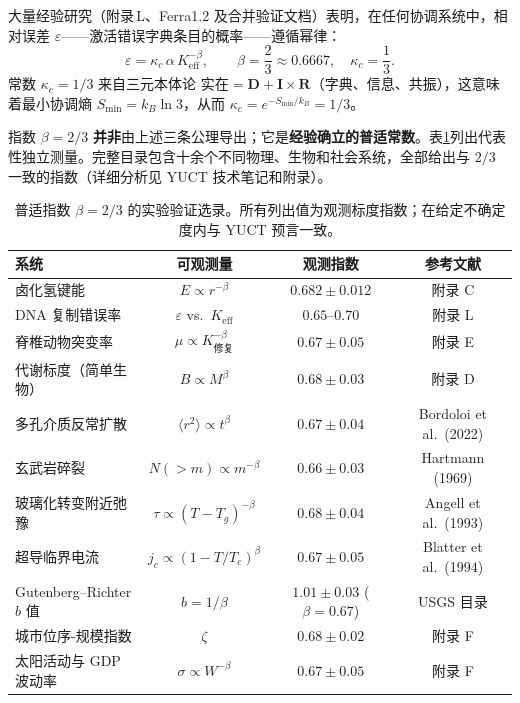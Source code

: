 \documentclass[12pt,a4paper]{article}
\begin{document}
	大量经验研究（附录 L、Ferra1.2 及合并验证文档）表明，在任何协调系统中，相对误差 \(\varepsilon\)——激活错误字典条目的概率——遵循幂律：
	\begin{equation}
		\boxed{\varepsilon = \kappa_c \, \alpha \, K_{\mathrm{eff}}^{-\beta}, \qquad \beta = \frac{2}{3} \approx 0.6667,\quad \kappa_c = \frac{1}{3}}.
		\label{eq:error-law}
	\end{equation}
	常数 \(\kappa_c = 1/3\) 来自三元本体论 \(\text{实在} = \mathbf{D} + \mathbf{I} \times \mathbf{R}\)（字典、信息、共振），这意味着最小协调熵 \(S_{\min} = k_B \ln 3\)，从而 \(\kappa_c = e^{-S_{\min}/k_B} = 1/3\)。
	
	指数 \(\beta = 2/3\) \textbf{并非}由上述三条公理导出；它是\textbf{经验确立的普适常数}。表\ref{tab:beta-evidence}列出代表性独立测量。完整目录包含十余个不同物理、生物和社会系统，全部给出与 \(2/3\) 一致的指数（详细分析见 YUCT 技术笔记和附录）。
	
	\begin{table}[H]
		\centering
		\caption{普适指数 \(\beta = 2/3\) 的实验验证选录。所有列出值为观测标度指数；在给定不确定度内与 YUCT 预言一致。}
		\label{tab:beta-evidence}
		\small
		\begin{tabular}{l c c c}
			\toprule
			\textbf{系统} & \textbf{可观测量} & \textbf{观测指数} & \textbf{参考文献} \\
			\midrule
			卤化氢键能 & \(E \propto r^{-\beta}\) & \(0.682 \pm 0.012\) & 附录 C \\
			DNA 复制错误率 & \(\varepsilon\) vs.\ \(K_{\mathrm{eff}}\) & \(0.65\text{--}0.70\) & 附录 L \\
			脊椎动物突变率 & \(\mu \propto K_{\text{修复}}^{-\beta}\) & \(0.67 \pm 0.05\) & 附录 E \\
			代谢标度（简单生物） & \(B \propto M^{\beta}\) & \(0.68 \pm 0.03\) & 附录 D \\
			多孔介质反常扩散 & \(\langle r^2 \rangle \propto t^{\beta}\) & \(0.67 \pm 0.04\) & Bordoloi et al.\ (2022) \\
			玄武岩碎裂 & \(N(>m) \propto m^{-\beta}\) & \(0.66 \pm 0.03\) & Hartmann (1969) \\
			玻璃化转变附近弛豫 & \(\tau \propto (T-T_g)^{-\beta}\) & \(0.68 \pm 0.04\) & Angell et al.\ (1993) \\
			超导临界电流 & \(j_c \propto (1-T/T_c)^{\beta}\) & \(0.67 \pm 0.05\) & Blatter et al.\ (1994) \\
			Gutenberg–Richter \(b\) 值 & \(b = 1/\beta\) & \(1.01 \pm 0.03\) (\(\beta=0.67\)) & USGS 目录 \\
			城市位序-规模指数 & \(\zeta\) & \(0.68 \pm 0.02\) & 附录 F \\
			太阳活动与 GDP 波动率 & \(\sigma \propto W^{-\beta}\) & \(0.67 \pm 0.05\) & 附录 F \\
			\bottomrule
		\end{tabular}
	\end{table}
	
\end{document}
